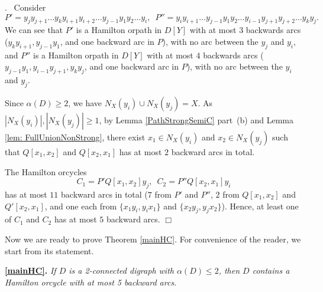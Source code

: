 \documentclass{article}
\newcommand{\2}{\vspace{2mm}}
\renewenvironment{proof}[1][]{\par \noindent {\bf Proof#1}.\ }{\hfill$\Box$
\par \vspace{11pt}}
\theoremstyle{definition}
\begin{document}
\begin{proof}
Consider 
\[
P'=y_j y_{j+1}\dots y_ky_{i+1}y_{i+2}\dots y_{j-1}y_1y_2\dots y_i, \enspace
P''=y_iy_{i+1}\dots y_{j-1}y_1y_2 \dots y_{i-1}y_{j+1}y_{j+2} \dots y_ky_j.
\]
We can see that $P'$ is a Hamilton orpath in $D[Y]$ with at most $3$ backwards arcs ($y_ky_{i+1}, y_{j-1}y_1$, and one backward arc in $P$), with no arc between the $y_j$ and $y_i$, and $P''$ is a Hamilton orpath in $D[Y]$ with at most $4$ backwards arcs ($y_{j-1}y_1, y_{i-1}y_{j+1},y_ky_j$, and one backward arc in $P$), with no arc between the $y_i$ and $y_j$.

Since $\alpha(D) \ge 2$, we have $N_X(y_i) \cup N_X(y_j) = X $. As $|N_X(y_i)|,|N_X(y_j)| \ge 1$, by Lemma \ref{PathStrongSemiC} part~(b) and Lemma \ref{lem: FullUnionNonStrong}, there exist $x_1 \in N_X(y_i)$ and $x_2 \in N_X(y_j)$ such that $Q[x_1,x_2]$ and $Q[x_2,x_1]$ has at most $2$ backward arcs in total.

The Hamilton orcycles
\[
C_1=P'Q[x_1,x_2]y_j, \enspace C_2=P''Q[x_2,x_1]y_i
\]
has at most $11$ backward arcs in total ($7$ from $P'$ and $P''$, $2$ from $Q[x_1,x_2]$ and $Q'[x_2,x_1]$, and one each from $\{x_1y_i,y_ix_1\}$ and $\{x_2y_j,y_jx_2\}$). Hence, at least one of $C_1$ and $C_2$ has at most $5$ backward arcs.
\end{proof}

Now we are ready to prove Theorem \ref{mainHC}. For convenience of the reader, we start from its statement. 

\vspace{2mm}

 {\bf \ref{mainHC}.}
{\em If $D$ is a 2-connected digraph with $\alpha(D) \le 2$, then $D$ contains a Hamilton orcycle with at most 5 backward arcs.}

\vspace{2mm}
\end{document}
